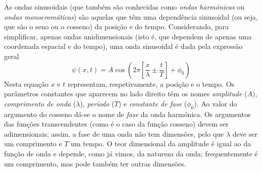 As ondas sinusoidais (que também são conhecidas como \emph{ondas harmónicas} ou
\emph{ondas monocro\-máticas}) são aquelas que têm uma dependência sinusoidal (ou
seja, que são o seno ou o cosseno) da posição e do tempo. Considerando, para
simplificar, apenas ondas unidimensionais (isto é, que dependem de apenas uma
coordenada espacial e do tempo), uma onda sinusoidal é dada pela
expressão geral
\begin{equation*}
    \psi(x,t)=A\cos\left(2\pi\left[\frac{x}{\lambda}\pm \frac{t}{T}\right]+
            \phi_0\right)
\end{equation*}
Nesta equação $x$ e $t$ representam, respetivamente, a posição e o tempo. Os
parâmetros  constantes que aparecem no lado direito têm os nomes
\emph{amplitude} ($A$), \emph{comprimento de onda} ($\lambda$), \emph{período}
($T$) e \emph{constante de fase} ($\phi_0$). Ao valor do argumento do cosseno
dá-se o nome de \emph{fase} da onda harmónica. Os argumentos das funções
transcendentes (como é o caso da função cosseno) devem ser adimensionais; assim,
a fase de uma onda não tem dimensões, pelo que $\lambda$ deve ser um comprimento
e $T$ um tempo. O teor dimensional da amplitude é igual ao da função de onda e
depende, como já vimos, da natureza da onda; frequentemente é um comprimento,
mas pode também ter outras dimensões.

